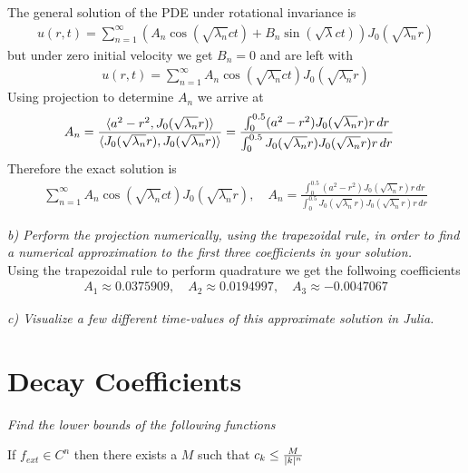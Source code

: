 \documentclass[12pt]{article}
\DeclarePairedDelimiter \abs{\lvert}{\rvert}%
\newenvironment{theorem}[2][]{\begin{trivlist}
\item[{\bfseries #1}\hskip \labelsep {\bfseries #2.}]}{\end{trivlist}}
\theoremstyle{remark}
\begin{document}
The general solution of the PDE under rotational invariance is 
\begin{align*}
u(r,t) = \sum\limits_{n=1}^\infty (A_n\cos(\sqrt{\lambda_n}ct) + B_n\sin(\sqrt{\lambda}ct))J_0(\sqrt{\lambda_n}r)
\end{align*}
but under zero initial velocity we get $B_n = 0$ and are left with
\begin{align*}
u(r,t) = \sum\limits_{n=1}^\infty A_n\cos(\sqrt{\lambda_n}ct)J_0(\sqrt{\lambda_n}r)
\end{align*}
Using projection to determine $A_n$ we arrive at 
\begin{align*}
A_n & = \frac{\braket{a^2 - r^2, J_0(\sqrt{\lambda_n}r)}}{\braket{J_0(\sqrt{\lambda_n}r),J_0(\sqrt{\lambda_n}r)}} = \frac{\int_0^{0.5}(a^2 - r^2)J_0(\sqrt{\lambda_n}r)r \, dr}{\int_0^{0.5}J_0(\sqrt{\lambda_n}r)J_0(\sqrt{\lambda_n}r)r \, dr}
\end{align*}
Therefore the exact solution is 
\begin{align*}
	\sum\limits_{n=1}^\infty A_n\cos(\sqrt{\lambda_n}ct)J_0(\sqrt{\lambda_n}r), \quad A_n = \frac{\int_0^{0.5}(a^2 - r^2)J_0(\sqrt{\lambda_n}r)r \, dr}{\int_0^{0.5}J_0(\sqrt{\lambda_n}r)J_0(\sqrt{\lambda_n}r)r \, dr}
\end{align*}

\textit{b) Perform the projection numerically, using the trapezoidal rule, in order to find a numerical approximation to the first three coefficients in your solution.} \\

Using the trapezoidal rule to perform quadrature we get the follwoing coefficients
\begin{align*}
	A_1 \approx  0.0375909, \quad A_2 \approx 0.0194997, \quad A_3 \approx −0.0047067
\end{align*}

\textit{c) Visualize a few different time-values of this approximate solution in Julia.}

\newpage

\section*{Decay Coefficients}

\textit{Find the lower bounds of the following functions} \\

\begin{theorem}{Theorem 1}
	If $f_{ext} \in C^n$ then there exists a $M$ such that $c_k \leq \frac{M}{\abs{k}^n}$
\end{theorem}
\end{document}
